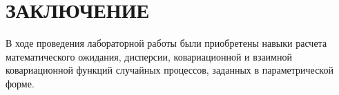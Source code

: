 \section*{ЗАКЛЮЧЕНИЕ}

В ходе проведения лабораторной работы были приобретены навыки расчета математического ожидания, дисперсии, ковариационной и взаимной ковариационной функций случайных процессов, заданных в параметрической форме.

\newpage
